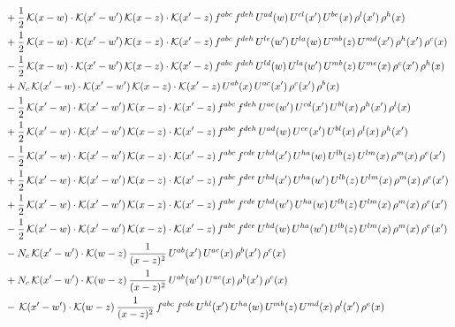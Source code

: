 \documentclass[9pt]{article}
\numberwithin{equation}{section}
\begin{document}
\begin{align}
&+\frac{1}{2}\,\mathcal{K}(x-w)\cdot\mathcal{K}(x'-w')\,\mathcal{K}(x-z)\cdot\mathcal{K}(x'-z)\,f^{abc}\,f^{deh}\,U^{ad}(w)\,U^{cl}(x')\,U^{be}(x)\,\rho^{l}(x')\,\rho^{h}(x)\notag\\
&+\frac{1}{2}\,\mathcal{K}(x-w)\cdot\mathcal{K}(x'-w')\,\mathcal{K}(x-z)\cdot\mathcal{K}(x'-z)\,f^{abc}\,f^{deh}\,U^{le}(w')\,U^{la}(w)\,U^{mb}(z)\,U^{md}(x')\,\rho^{h}(x')\,\rho^{c}(x)\notag\\
&-\frac{1}{2}\,\mathcal{K}(x-w)\cdot\mathcal{K}(x'-w')\,\mathcal{K}(x-z)\cdot\mathcal{K}(x'-z)\,f^{abc}\,f^{deh}\,U^{ld}(w)\,U^{la}(w')\,U^{mb}(z)\,U^{me}(x)\,\rho^{c}(x')\,\rho^{h}(x)\notag\\
&+N_{c}\,\mathcal{K}(x'-w)\cdot\mathcal{K}(x'-w')\,\mathcal{K}(x-z)\cdot\mathcal{K}(x'-z)\,U^{ab}(x)\,U^{ac}(x')\,\rho^{c}(x')\,\rho^{b}(x)\notag\\
&-\frac{1}{2}\,\mathcal{K}(x'-w)\cdot\mathcal{K}(x'-w')\,\mathcal{K}(x-z)\cdot\mathcal{K}(x'-z)\,f^{abc}\,f^{deh}\,U^{ae}(w')\,U^{cd}(x')\,U^{bl}(x)\,\rho^{h}(x')\,\rho^{l}(x)\notag\\
&+\frac{1}{2}\,\mathcal{K}(x'-w)\cdot\mathcal{K}(x'-w')\,\mathcal{K}(x-z)\cdot\mathcal{K}(x'-z)\,f^{abc}\,f^{deh}\,U^{ad}(w)\,U^{ce}(x')\,U^{bl}(x)\,\rho^{l}(x)\,\rho^{h}(x')\notag\\
&-\frac{1}{2}\,\mathcal{K}(x'-w)\cdot\mathcal{K}(x'-w')\,\mathcal{K}(x-z)\cdot\mathcal{K}(x'-z)\,f^{abc}\,f^{cde}\,U^{hd}(x')\,U^{ha}(w)\,U^{lb}(z)\,U^{lm}(x)\,\rho^{m}(x)\,\rho^{e}(x')\notag\\
&+\frac{1}{2}\,\mathcal{K}(x'-w)\cdot\mathcal{K}(x'-w')\,\mathcal{K}(x-z)\cdot\mathcal{K}(x'-z)\,f^{abc}\,f^{dce}\,U^{hd}(x')\,U^{ha}(w')\,U^{lb}(z)\,U^{lm}(x)\,\rho^{m}(x)\,\rho^{e}(x')\notag\\
&+\frac{1}{2}\,\mathcal{K}(x'-w)\cdot\mathcal{K}(x'-w')\,\mathcal{K}(x-z)\cdot\mathcal{K}(x'-z)\,f^{abc}\,f^{cde}\,U^{hd}(w')\,U^{ha}(w)\,U^{lb}(z)\,U^{lm}(x)\,\rho^{m}(x)\,\rho^{e}(x')\notag\\
&-\frac{1}{2}\,\mathcal{K}(x'-w)\cdot\mathcal{K}(x'-w')\,\mathcal{K}(x-z)\cdot\mathcal{K}(x'-z)\,f^{abc}\,f^{dce}\,U^{hd}(w)\,U^{ha}(w')\,U^{lb}(z)\,U^{lm}(x)\,\rho^{m}(x)\,\rho^{e}(x')\notag\\
&-N_{c}\,\mathcal{K}(x'-w')\cdot\mathcal{K}(w-z)\,\frac{1}{(x-z)^{2}}\,U^{ab}(x')\,U^{ac}(x)\,\rho^{b}(x')\,\rho^{c}(x)\notag\\
&+N_{c}\,\mathcal{K}(x'-w')\cdot\mathcal{K}(w-z)\,\frac{1}{(x-z)^{2}}\,U^{ab}(w')\,U^{ac}(x)\,\rho^{b}(x')\,\rho^{c}(x)\notag\\
&-\,\mathcal{K}(x'-w')\cdot\mathcal{K}(w-z)\,\frac{1}{(x-z)^{2}}\,f^{abc}\,f^{cde}\,U^{hl}(x')\,U^{ha}(w)\,U^{mb}(z)\,U^{md}(x)\,\rho^{l}(x')\,\rho^{e}(x)\notag\\

\end{align}
\end{document}
